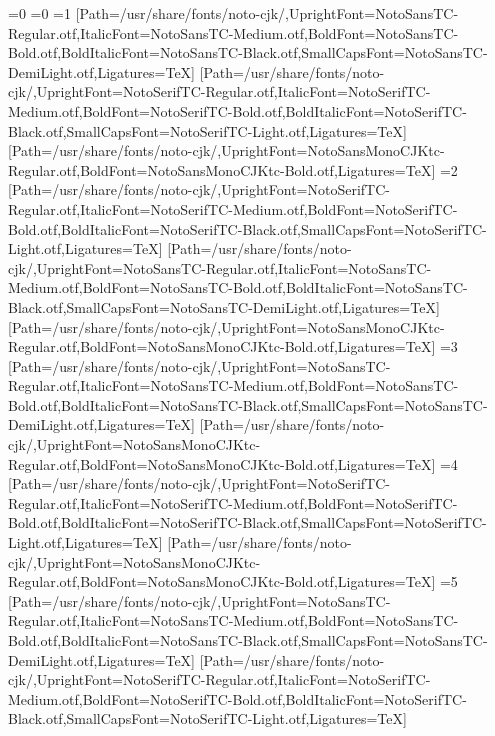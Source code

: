 \fi\fi\fi\fi\fi\fi\fi
\else
\ifnum\value{CJKFonts}=0\else
\ifnum\value{CJKLanguage}=0
\ifnum\value{CJKFonts}=1
[Path=/usr/share/fonts/noto-cjk/,UprightFont=NotoSansTC-Regular.otf,ItalicFont=NotoSansTC-Medium.otf,BoldFont=NotoSansTC-Bold.otf,BoldItalicFont=NotoSansTC-Black.otf,SmallCapsFont=NotoSansTC-DemiLight.otf,Ligatures=TeX]
[Path=/usr/share/fonts/noto-cjk/,UprightFont=NotoSerifTC-Regular.otf,ItalicFont=NotoSerifTC-Medium.otf,BoldFont=NotoSerifTC-Bold.otf,BoldItalicFont=NotoSerifTC-Black.otf,SmallCapsFont=NotoSerifTC-Light.otf,Ligatures=TeX]
[Path=/usr/share/fonts/noto-cjk/,UprightFont=NotoSansMonoCJKtc-Regular.otf,BoldFont=NotoSansMonoCJKtc-Bold.otf,Ligatures=TeX]
\else\ifnum\value{CJKFonts}=2
[Path=/usr/share/fonts/noto-cjk/,UprightFont=NotoSerifTC-Regular.otf,ItalicFont=NotoSerifTC-Medium.otf,BoldFont=NotoSerifTC-Bold.otf,BoldItalicFont=NotoSerifTC-Black.otf,SmallCapsFont=NotoSerifTC-Light.otf,Ligatures=TeX]
[Path=/usr/share/fonts/noto-cjk/,UprightFont=NotoSansTC-Regular.otf,ItalicFont=NotoSansTC-Medium.otf,BoldFont=NotoSansTC-Bold.otf,BoldItalicFont=NotoSansTC-Black.otf,SmallCapsFont=NotoSansTC-DemiLight.otf,Ligatures=TeX]
[Path=/usr/share/fonts/noto-cjk/,UprightFont=NotoSansMonoCJKtc-Regular.otf,BoldFont=NotoSansMonoCJKtc-Bold.otf,Ligatures=TeX]
\else\ifnum\value{CJKFonts}=3
[Path=/usr/share/fonts/noto-cjk/,UprightFont=NotoSansTC-Regular.otf,ItalicFont=NotoSansTC-Medium.otf,BoldFont=NotoSansTC-Bold.otf,BoldItalicFont=NotoSansTC-Black.otf,SmallCapsFont=NotoSansTC-DemiLight.otf,Ligatures=TeX]
[Path=/usr/share/fonts/noto-cjk/,UprightFont=NotoSansMonoCJKtc-Regular.otf,BoldFont=NotoSansMonoCJKtc-Bold.otf,Ligatures=TeX]
\else\ifnum\value{CJKFonts}=4
[Path=/usr/share/fonts/noto-cjk/,UprightFont=NotoSerifTC-Regular.otf,ItalicFont=NotoSerifTC-Medium.otf,BoldFont=NotoSerifTC-Bold.otf,BoldItalicFont=NotoSerifTC-Black.otf,SmallCapsFont=NotoSerifTC-Light.otf,Ligatures=TeX]
[Path=/usr/share/fonts/noto-cjk/,UprightFont=NotoSansMonoCJKtc-Regular.otf,BoldFont=NotoSansMonoCJKtc-Bold.otf,Ligatures=TeX]
\else\ifnum\value{CJKFonts}=5
[Path=/usr/share/fonts/noto-cjk/,UprightFont=NotoSansTC-Regular.otf,ItalicFont=NotoSansTC-Medium.otf,BoldFont=NotoSansTC-Bold.otf,BoldItalicFont=NotoSansTC-Black.otf,SmallCapsFont=NotoSansTC-DemiLight.otf,Ligatures=TeX]
[Path=/usr/share/fonts/noto-cjk/,UprightFont=NotoSerifTC-Regular.otf,ItalicFont=NotoSerifTC-Medium.otf,BoldFont=NotoSerifTC-Bold.otf,BoldItalicFont=NotoSerifTC-Black.otf,SmallCapsFont=NotoSerifTC-Light.otf,Ligatures=TeX]
